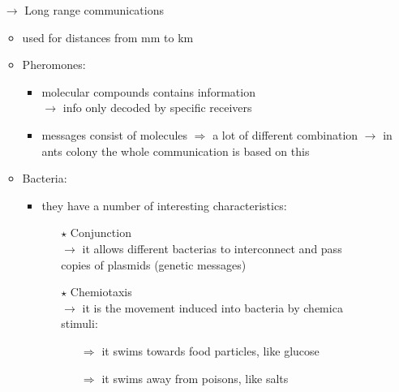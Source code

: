 \begin{itemize}
\begin{itemize}
\begin{itemize}
\begin{itemize}
            \end{itemize} 
        \end{itemize}
        \item[$\rightarrow$] Long range communications
        \begin{itemize}
            \item used for distances from mm to km
            \item Pheromones:
            \begin{itemize}
                \item molecular compounds contains information\\
                $\rightarrow$ info only decoded by specific receivers
                \item messages consist of molecules $\Rightarrow$ a lot of different combination
                $\rightarrow$ in ants colony the whole communication is based on this
            \end{itemize}
            \item Bacteria:
            \begin{itemize}
                \item they have a number of interesting characteristics:
                \begin{enumerate}
                    \addtolength{\itemindent}{0.3cm}
                    \item[$\star$] Conjunction\\[0.15cm]
                    \hspace*{0.3cm}$\rightarrow$ it allows different bacterias to interconnect and pass\\
                    \hspace*{0.3cm}copies of plasmids (genetic messages)
                    \item[$\star$] Chemiotaxis\\[0.15cm]
                    \hspace*{0.3cm}$\rightarrow$ it is the movement induced into bacteria by chemica\\
                    \hspace*{0.3cm}stimuli:
                    \vspace*{-0.1cm}
                    \begin{enumerate}
                        \addtolength{\itemindent}{0.7cm}
                        \item[$\Rightarrow$] it swims towards food particles, like glucose
                        \item[$\Rightarrow$] it  swims away from poisons, like salts

\end{enumerate}
\end{enumerate}
\end{itemize}
\end{itemize}
\end{itemize}
\end{itemize}
